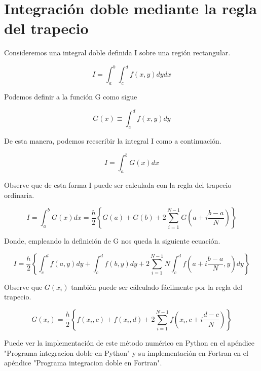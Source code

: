 \section{Integración doble mediante la regla del trapecio}

Consideremos una integral doble definida I sobre una región rectangular.

\begin{equation}
    I = \displaystyle\int_{a}^{b} \displaystyle\int_{c}^{d} 
    f(x,y) dy dx
\end{equation}

Podemos definir a la función G como sigue

\begin{equation}
    G(x) \equiv \displaystyle\int_{c}^{d} f(x,y) dy
\end{equation}

De esta manera, podemos reescribir la integral I como a continuación.

\begin{equation}
    I = \displaystyle\int_{a}^{b} G(x) dx
\end{equation}

Observe que de esta forma I puede ser calculada con la regla del trapecio ordinaria.

\begin{equation} 
    I =
    \displaystyle\int_{a}^{b} G(x) dx = 
    \frac{h}{2} \left\{ 
    G(a) + G(b) + 2\displaystyle\sum_{i=1}^{N-1} G(a + i \frac{b-a}{N})
    \right\}
\end{equation}

Donde, empleando la definición de G nos queda la siguiente ecuación.

\begin{equation} 
    I =
    \frac{h}{2} \left\{ 
        \displaystyle\int_{c}^{d} f(a,y) dy
        + \displaystyle\int_{c}^{d} f(b,y) dy
        + 2\displaystyle\sum_{i=1}^{N-1} {N}\displaystyle\int_{c}^{d} f(a + i \frac{b-a}{N},y) dy
    \right\}
\end{equation}

Observe que $G(x_i)$ también puede ser cálculado fácilmente por la regla del trapecio.

\begin{equation} 
     G(x_i) = 
    \frac{h}{2} \left\{ 
    f(x_i,c) + f(x_i,d) + 2\displaystyle\sum_{i=1}^{N-1} f(x_i, c + i \frac{d-c}{N})
    \right\}
\end{equation}

Puede ver la implementación de este método numérico en Python en el apéndice "Programa integracion doble en Python" y su implementación en Fortran en el apéndice "Programa integracion doble en Fortran".